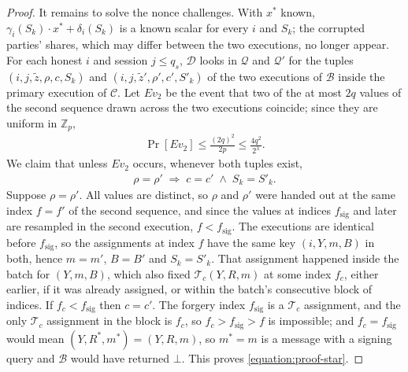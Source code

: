 \documentclass{article}
\theoremstyle{plain}
\theoremstyle{definition}
\theoremstyle{remark}
\begin{document}
\begin{proof}
  It remains to solve the nonce challenges.  With $x^*$ known, $\gamma_i(S_k) \cdot x^* + \delta_i(S_k)$ is a known scalar for every $i$ and $S_k$; the corrupted parties' shares, which may differ between the two executions, no longer appear.  For each honest $i$ and session $j \le q_s$, $\mathcal{D}$ looks in $\mathcal{Q}$ and $\mathcal{Q}'$ for the tuples $(i, j, \tilde{z}, \rho, c, S_k)$ and $(i, j, \tilde{z}', \rho', c', S'_k)$ of the two executions of $\mathcal{B}$ inside the primary execution of $\mathcal{C}$.  Let $\mathit{Ev}_2$ be the event that two of the at most $2q$ values of the second sequence drawn across the two executions coincide; since they are uniform in $\mathbb{Z}_p$,
  \begin{align}\label{equation:proof-ev2}
    \Pr[\mathit{Ev}_2] \le \frac{(2q)^2}{2p} \le \frac{4q^2}{2^{\lambda}}.
  \end{align}
  We claim that unless $\mathit{Ev}_2$ occurs, whenever both tuples exist,
  \begin{align}\label{equation:proof-star}
    \rho = \rho' \;\Longrightarrow\; c = c' \;\wedge\; S_k = S'_k.
  \end{align}
  Suppose $\rho = \rho'$.  All values are distinct, so $\rho$ and $\rho'$ were handed out at the same index $f = f'$ of the second sequence, and since the values at indices $f_{\mathrm{sig}}$ and later are resampled in the second execution, $f < f_{\mathrm{sig}}$.  The executions are identical before $f_{\mathrm{sig}}$, so the assignments at index $f$ have the same key $(i, Y, m, B)$ in both, hence $m = m'$, $B = B'$ and $S_k = S'_k$.  That assignment happened inside the batch for $(Y, m, B)$, which also fixed $\mathcal{T}_c(Y, R, m)$ at some index $f_c$, either earlier, if it was already assigned, or within the batch's consecutive block of indices.  If $f_c < f_{\mathrm{sig}}$ then $c = c'$.  The forgery index $f_{\mathrm{sig}}$ is a $\mathcal{T}_c$ assignment, and the only $\mathcal{T}_c$ assignment in the block is $f_c$, so $f_c > f_{\mathrm{sig}} > f$ is impossible; and $f_c = f_{\mathrm{sig}}$ would mean $(Y, R^*, m^*) = (Y, R, m)$, so $m^* = m$ is a message with a signing query and $\mathcal{B}$ would have returned $\bot$.  This proves \eqref{equation:proof-star}.


\end{proof}
\end{document}
